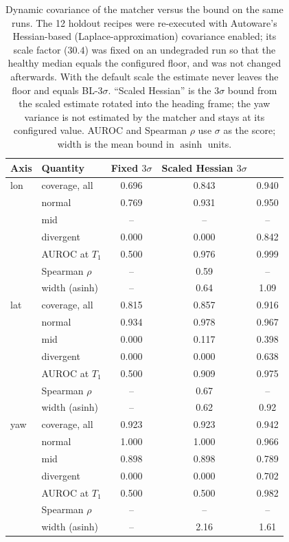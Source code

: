 \begin{table}[!t]
\caption{Dynamic covariance of the matcher versus the \meld{} bound on the same runs. The 12 holdout recipes were re-executed with Autoware's Hessian-based (Laplace-approximation) covariance enabled; its scale factor ($30.4$) was fixed on an undegraded run so that the healthy median equals the configured floor, and was not changed afterwards. With the default scale the estimate never leaves the floor and equals BL-3$\sigma$. ``Scaled Hessian'' is the $3\sigma$ bound from the scaled estimate rotated into the heading frame; the yaw variance is not estimated by the matcher and stays at its configured value. AUROC and Spearman $\rho$ use $\sigma$ as the score; width is the mean bound in $\operatorname{asinh}$ units.}
\label{tab:dyncov}
\centering
\footnotesize
\setlength{\tabcolsep}{2.6pt}
\begin{tabular}{llccc}
\toprule
Axis & Quantity & Fixed $3\sigma$ & Scaled Hessian $3\sigma$ & \meld{} \\
\midrule
lon & coverage, all & 0.696 & 0.843 & 0.940 \\
 & \quad normal & 0.769 & 0.931 & 0.950 \\
 & \quad mid & -- & -- & -- \\
 & \quad divergent & 0.000 & 0.000 & 0.842 \\
 & AUROC at $T_1$ & 0.500 & 0.976 & 0.999 \\
 & Spearman $\rho$ & -- & 0.59 & -- \\
 & width (asinh) & -- & 0.64 & 1.09 \\
\midrule
lat & coverage, all & 0.815 & 0.857 & 0.916 \\
 & \quad normal & 0.934 & 0.978 & 0.967 \\
 & \quad mid & 0.000 & 0.117 & 0.398 \\
 & \quad divergent & 0.000 & 0.000 & 0.638 \\
 & AUROC at $T_1$ & 0.500 & 0.909 & 0.975 \\
 & Spearman $\rho$ & -- & 0.67 & -- \\
 & width (asinh) & -- & 0.62 & 0.92 \\
\midrule
yaw & coverage, all & 0.923 & 0.923 & 0.942 \\
 & \quad normal & 1.000 & 1.000 & 0.966 \\
 & \quad mid & 0.898 & 0.898 & 0.789 \\
 & \quad divergent & 0.000 & 0.000 & 0.702 \\
 & AUROC at $T_1$ & 0.500 & 0.500 & 0.982 \\
 & Spearman $\rho$ & -- & -- & -- \\
 & width (asinh) & -- & 2.16 & 1.61 \\
\bottomrule
\end{tabular}
\end{table}
